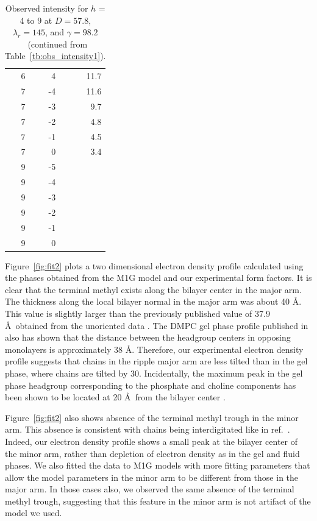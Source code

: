 \begin{table}[htbp]
\begin{tabular}{rrr}
6 & 4 & 11.7 \\ 
7 & -4 & 11.6 \\
7 & -3 & 9.7 \\ 
7 & -2 & 4.8 \\ 
7 & -1 & 4.5 \\ 
7 & 0 & 3.4 \\ 
9 & -5 & \\
9 & -4 & \\
9 & -3 & \\
9 & -2 & \\
9 & -1 & \\
9 & 0 &\\
\hline
\end{tabular}
  \caption{Observed intensity for $h$ = 4 to 9 at $D=57.8$, $\lambda_r=145$, and 
  $\gamma=98.2$\textdegree\ (continued from Table~\ref{tb:obs_intensity1}).}
  \label{tb:obs_intensity2}
\end{table}

Figure~\ref{fig:fit2} plots a two dimensional electron density profile calculated
using the phases obtained from the M1G model and our experimental form factors.
It is clear that the terminal methyl exists along the bilayer 
center in the major arm. The thickness along the local bilayer normal
in the major arm was about 40 \AA. This value is slightly larger than
the previously published value of 37.9 \AA\ obtained from the unoriented
data \cite{ref:Sun96}. The DMPC gel phase profile published in 
\cite{Tristram-Nagle02} also has shown that the distance between
the headgroup centers in opposing monolayers is approximately 38 \AA.
Therefore, our experimental
electron density profile suggests that chains in the ripple major arm are
less tilted than in the gel phase, where chains are tilted by 30\textdegree.
Incidentally, the maximum peak in the gel phase headgroup corresponding to the
phosphate and choline components has been shown to be located at 20 \AA\
from the bilayer center \cite{Tristram-Nagle02}. 

Figure~\ref{fig:fit2} also shows absence of the terminal methyl trough
in the minor arm. This absence is consistent with chains being interdigitated
like in ref.~\cite{ref:deVries05}. Indeed, our electron density profile
shows a small peak at the bilayer center of the minor arm, rather than
depletion of electron density as in the gel and fluid phases. We also fitted
the data to M1G models with more fitting parameters that allow the model 
parameters in the minor arm to be different from those in the major arm.
In those cases also, we observed the same absence of the terminal methyl trough,
suggesting that this feature in the minor arm is not artifact of the model we used.


